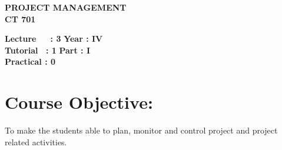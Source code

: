 \begin{center}
    \textbf{\huge{\uppercase{Project Management}}}
    \\
    \vspace{.5cm}
    \textbf{\large{CT 701}}
\end{center}

\noindent\textbf{Lecture\ \ \ : 3} \hfill \textbf{Year : IV} \\
\textbf{Tutorial \ : 1} \hfill \textbf{Part : I } \\
\textbf{Practical : 0}  \\

\par
\noindent 
\section*{Course Objective:}
To make the students able to plan, monitor and control project and project related activities.

